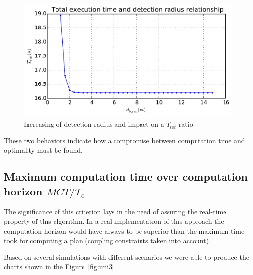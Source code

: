 \documentclass[eprint]{actapoly}
\begin{document}

\begin{figure}[!h]\centering
  \includegraphics[width=\linewidth]{./images/drho/drho-tot.pdf}
  \caption{Increasing of detection radius and impact on a $T_{tot}$ 
ratio\label{fig:drhotot}}
\end{figure}

These two behaviors indicate how a compromise between computation time and optimality must be found.


\subsection{Maximum computation time over computation horizon $MCT/T_c$}

The significance of this criterion lays in the need of assuring the 
real-time property of this algorithm.
In a real implementation of this approach the computation horizon would have 
always to be superior than the
maximum time took for computing a plan (coupling constraints
taken into account).

Based on several simulations with different scenarios we were able to
produce the charts shown in the Figure~\ref{fig:uni3}
\end{document}
